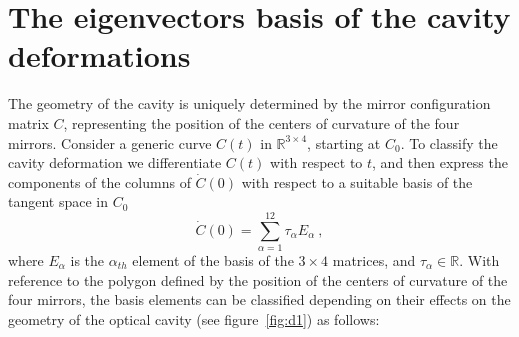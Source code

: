 \documentclass[12pt,a4paper,final]{iopart}
\begin{document}
\section{The eigenvectors basis of the cavity deformations}
The geometry of the  cavity is uniquely determined by the mirror
configuration matrix $C$, representing the position of the centers
of curvature of the four mirrors. Consider a generic curve $C(t)$
in $\mathbb{R}^{3\times4}$, starting at $C_{0}$. To classify the cavity deformation we differentiate $C(t)$
with respect to $t$, and then express the components of the columns
of $\dot{C}(0)$ with respect to a suitable basis of the tangent space
in $C_{0}$
\begin{equation}
\dot{C}(0)=\sum_{\alpha=1}^{12}\tau_{\alpha}E_{\alpha}\ \nonumber ,
\end{equation}
where $E_{\alpha}$ is the $\alpha_{th}$ element of the basis of
the $3\times4$ matrices, and $\tau_{\alpha}\in\mathbb{R}$. With reference to the polygon defined by the position 
of the centers of curvature of the four mirrors, the basis
elements can be classified depending on their effects on the geometry
of the optical cavity (see figure~\ref{fig:d1}) as follows: 
\end{document}
